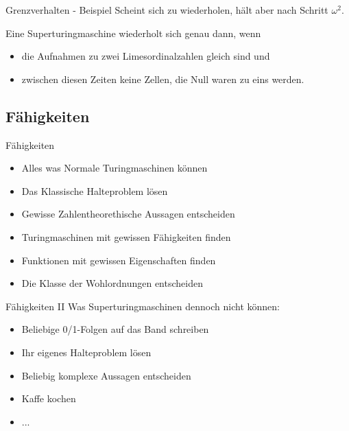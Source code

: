 \begin{frame}[c]{Grenzverhalten - Beispiel}
    \normalsize
    \pause
    Scheint sich zu wiederholen, hält aber nach Schritt $\omega^2$.

    \bigskip
    \pause
    Eine Superturingmaschine wiederholt sich genau dann, wenn
    \begin{itemize}
        \item die Aufnahmen zu zwei Limesordinalzahlen gleich sind und
        \item zwischen diesen Zeiten keine Zellen, die Null waren zu eins werden.
    \end{itemize}
\end{frame}


\subsection{Fähigkeiten}

\begin{frame}[c]{Fähigkeiten}
    \large
    \begin{itemize}
        \item Alles was Normale Turingmaschinen können
            \pause
        \item Das Klassische Halteproblem lösen
            \pause
        \item Gewisse Zahlentheorethische Aussagen entscheiden
            \pause
        \item Turingmaschinen mit gewissen Fähigkeiten finden
            \pause
        \item Funktionen mit gewissen Eigenschaften finden
            \pause
        \item Die Klasse der Wohlordnungen entscheiden
    \end{itemize}
\end{frame}


\begin{frame}[c]{Fähigkeiten II}
    \Large
    Was Superturingmaschinen dennoch nicht können:
    \begin{itemize}
        \item Beliebige 0/1-Folgen auf das Band schreiben
            \pause
        \item Ihr eigenes Halteproblem lösen
            \pause
        \item Beliebig komplexe Aussagen entscheiden
            \pause
        \item Kaffe kochen
            \pause
        \item ...
    \end{itemize}
\end{frame}




